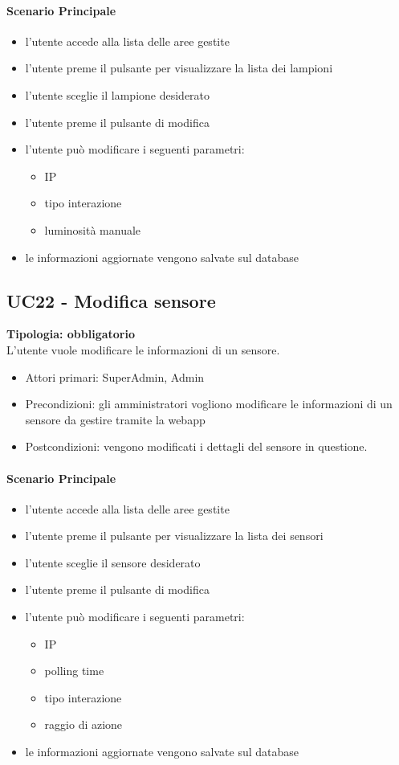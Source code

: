 \documentclass[12pt]{article}
\begin{document}
\paragraph{Scenario Principale}
\begin{itemize}
	\item l'utente accede alla lista delle aree gestite
	\item l'utente preme il pulsante per visualizzare la lista dei lampioni
	\item l'utente sceglie il lampione desiderato
	\item l'utente preme il pulsante di modifica
	\item l'utente può modificare i seguenti parametri:
		\begin{itemize}
			\item IP
			\item tipo interazione
			\item luminosità manuale
		\end{itemize}
	\item le informazioni aggiornate vengono salvate sul database
\end{itemize}

\subsection{UC22 - Modifica sensore}
\textbf{Tipologia: obbligatorio} \\
L'utente vuole modificare le informazioni di un sensore.
\begin{itemize}
	\item Attori primari: SuperAdmin, Admin
	\item Precondizioni: gli amministratori vogliono modificare le informazioni di un sensore da gestire tramite la webapp
	\item Postcondizioni: vengono modificati i dettagli del sensore in questione.
\end{itemize}
\paragraph{Scenario Principale}
\begin{itemize}
	\item l'utente accede alla lista delle aree gestite
	\item l'utente preme il pulsante per visualizzare la lista dei sensori
	\item l'utente sceglie il sensore desiderato
	\item l'utente preme il pulsante di modifica
	\item l'utente può modificare i seguenti parametri:
		\begin{itemize}
			\item IP
			\item polling time
			\item tipo interazione
			\item raggio di azione
		\end{itemize}
	\item le informazioni aggiornate vengono salvate sul database
\end{itemize}
\end{document}
